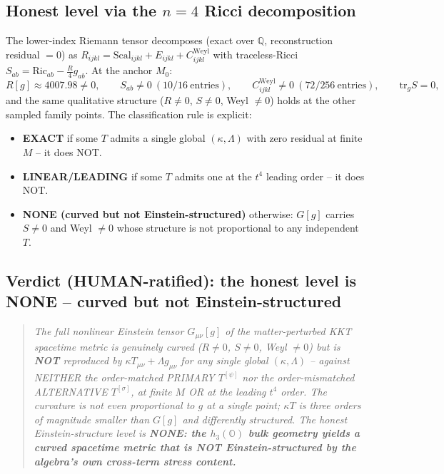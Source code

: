 \subsection{Honest level via the $n=4$ Ricci decomposition}

The lower-index Riemann tensor decomposes (exact over $\mathbb{Q}$, reconstruction
residual $=0$) as $R_{ijkl}=\mathrm{Scal}_{ijkl}+E_{ijkl}+C^{\mathrm{Weyl}}_{ijkl}$ with
traceless-Ricci $S_{ab}=\mathrm{Ric}_{ab}-\tfrac{R}{4}g_{ab}$. At the anchor $M_0$:
\begin{equation}
  R[g]\approx4007.98\neq0,\qquad
  S_{ab}\neq0\ (10/16\ \text{entries}),\qquad
  C^{\mathrm{Weyl}}_{ijkl}\neq0\ (72/256\ \text{entries}),\qquad
  \mathrm{tr}_g S = 0,
  \label{eq:decomp}
\end{equation}
and the same qualitative structure ($R\neq0$, $S\neq0$, Weyl $\neq0$) holds at the
other sampled family points. The classification rule is explicit:
\begin{itemize}
\item \textbf{EXACT} if some $T$ admits a single global $(\kappa,\Lambda)$ with zero
  residual at finite $M$ -- it does NOT.
\item \textbf{LINEAR/LEADING} if some $T$ admits one at the $t^4$ leading order -- it
  does NOT.
\item \textbf{NONE (curved but not Einstein-structured)} otherwise: $G[g]$ carries
  $S\neq0$ and Weyl $\neq0$ whose structure is not proportional to any independent $T$.
\end{itemize}

\subsection{Verdict (HUMAN-ratified): the honest level is NONE -- curved but not
Einstein-structured}

\begin{quote}\itshape
The full nonlinear Einstein tensor $G_{\mu\nu}[g]$ of the matter-perturbed KKT spacetime
metric is genuinely curved ($R\neq0$, $S\neq0$, Weyl $\neq0$) but is \textbf{NOT}
reproduced by $\kappa T_{\mu\nu}+\Lambda g_{\mu\nu}$ for any single global $(\kappa,
\Lambda)$ -- against NEITHER the order-matched PRIMARY $T^{[\psi]}$ nor the order-mismatched
ALTERNATIVE $T^{[\sigma]}$, at finite $M$ OR at the leading $t^4$ order. The curvature is
not even proportional to $g$ at a single point; $\kappa T$ is three orders of magnitude
smaller than $G[g]$ and differently structured. The honest Einstein-structure level is
\textbf{NONE: the $h_3(\mathbb{O})$ bulk geometry yields a curved spacetime metric that is
NOT Einstein-structured by the algebra's own cross-term stress content.}
\end{quote}


